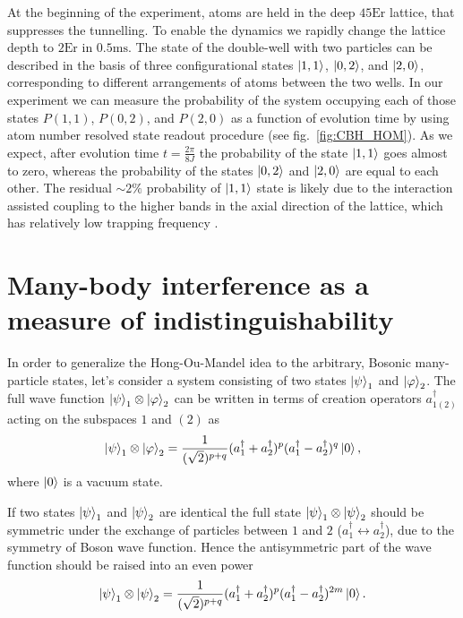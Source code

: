 At the beginning of the experiment, atoms are held in the deep $45 \textrm{Er}$ lattice, that suppresses the tunnelling. To enable the dynamics we rapidly change the lattice depth to $2\textrm{Er}$ in $0.5\textrm{ms}$. The state of the double-well with two particles can be described in the basis of three configurational states $\left|1,1\right\rangle$, $\left|0,2\right\rangle$, and $\left|2,0\right\rangle$, corresponding to different arrangements of atoms between the two wells. In our experiment we can measure the probability of the system occupying each of those states $P(1,1)$, $P(0,2)$, and $P(2,0)$ as a function of evolution time by using atom number resolved state readout procedure (see fig.~\ref{fig:CBH_HOM}). As we expect, after evolution time $t= \frac{2 \pi}{8J}$ the probability of the state $\left|1,1\right\rangle$ goes almost to zero, whereas the probability of the states $\left|0,2\right\rangle$ and $\left|2,0\right\rangle$ are equal to each other. The residual $\sim 2\%$ probability of $\left|1,1\right\rangle$ state is likely due to the interaction assisted coupling to the higher bands in the axial direction of the lattice, which has relatively low trapping frequency \cite{Preiss thesis}. 

\section{Many-body interference as a measure of indistinguishability}
In order to generalize the Hong-Ou-Mandel idea to the arbitrary, Bosonic many-particle states, let's consider a system consisting of two states $\left|\psi\right\rangle_1$ and $\left|\varphi\right\rangle_2$. The full wave function $\left|\psi\right\rangle_1 \otimes \left|\varphi\right\rangle_2$ can be written in terms of creation operators $a_{1(2)}^{\dagger}$ acting on the subspaces $1$ and $(2)$ as
\begin{equation}
\left|\psi\right\rangle_1 \otimes \left|\varphi\right\rangle_2 = \frac{1}{(\sqrt{2})^{p+q}}(a^{\dagger}_1 + a^{\dagger}_2)^p(a^{\dagger}_1 - a^{\dagger}_2)^q\left|0\right\rangle,
\end{equation}
where $\left|0\right\rangle$ is a vacuum state.

If two states $\left|\psi\right\rangle_1$ and $\left|\psi\right\rangle_2$ are identical the full state $\left|\psi\right\rangle_1 \otimes \left|\psi\right\rangle_2$ should be symmetric under the exchange of particles between $1$ and $2$ ($a_{1}^{\dagger} \leftrightarrow a_2^{\dagger}$), due to the symmetry of Boson wave function. Hence the antisymmetric part of the wave function should be raised into an even power
\begin{equation}
\left|\psi\right\rangle_1 \otimes \left|\psi\right\rangle_2 = \frac{1}{(\sqrt{2})^{p+q}}(a^{\dagger}_1 + a^{\dagger}_2)^p(a^{\dagger}_1 - a^{\dagger}_2)^{2m}\left|0\right\rangle.
\end{equation}

